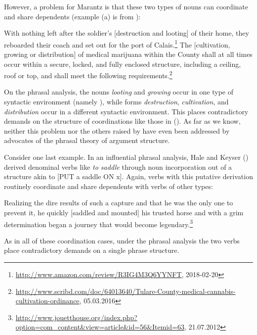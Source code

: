 \addlines
However, a problem for Marantz is that these two types of nouns can coordinate and share dependents (example
(a) is from ): 

\eal
\ex With nothing left after the soldier's [destruction and looting] of their home, they reboarded
their coach and set out for the port of Calais.\footnote{%
  \url{http://www.amazon.com/review/R3IG4M3Q6YYNFT}, 2018-02-20}
\ex  The [cultivation, growing or distribution] of medical marijuana within the County shall at all
times occur within a secure, locked, and fully enclosed structure, including a ceiling, roof or top,
and shall meet the following
requirements.\footnote{%
\href{http://www.scribd.com/doc/64013640/Tulare-County-medical-cannabis-cultivation-ordinance}{http://www.scribd.com/doc/64013640/Tulare-County-medical-cannabis-cultivation-ordinance}, 05.03.2016}  
\zl

On the phrasal analysis, the nouns \emph{looting} and \emph{growing} occur in one type
of syntactic environment (namely \vP), while forms \emph{destruction}, \emph{cultivation}, 
 and \emph{distribution} occur in a different syntactic environment.  This places contradictory
demands on the structure of coordinations like those in ().  As far as we know, neither this problem nor
the others raised by \citet{Wechsler2008a} have even been addressed by advocates of the phrasal theory of
argument structure.    

Consider one last example.  In an influential phrasal analysis, Hale and Keyser (\citeyear{HK93a-u})
derived denominal verbs like \emph{to saddle} through noun incorporation out of a structure akin to
[PUT a saddle ON x].  Again, verbs with this putative derivation routinely coordinate and share
dependents with verbs of other types: 

\ea
Realizing the dire results of such a capture and that he was the only one to prevent it, he quickly
[saddled and mounted] his trusted horse and with a grim determination began a journey that would
become legendary.\footnote{%
  \url{http://www.jouetthouse.org/index.php?option=com_content&view=article&id=56&Itemid=63},
  21.07.2012}  
\z

\noindent
As in all of these \xnull coordination cases, under the phrasal analysis the two verbs place
contradictory demands on a single phrase structure.   

